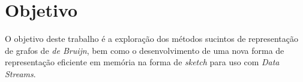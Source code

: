 \section{Objetivo}

O objetivo deste trabalho é a exploração dos métodos sucintos de representação
de grafos de \emph{de Bruijn}, bem como o desenvolvimento de uma nova forma de
representação eficiente em memória na forma de \emph{sketch} para uso com
\emph{Data Streams}.